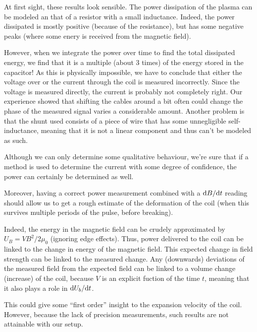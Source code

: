 At first sight, these results look sensible. The power dissipation of the 
plasma can be modeled an that of a resistor with a small inductance.  
Indeed, the power dissipated is mostly positive (because of the 
resistance), but has some negative peaks (where some enery is received from 
the magnetic field).

However, when we integrate the power over time to find the total dissipated 
energy, we find that it is a multiple (about 3 times) of the energy stored 
in the capacitor! As this is physically impossible, we have to conclude 
that either the voltage over or the current through the coil is measured 
incorrectly. Since the voltage is measured directly, the current is 
probably not completely right.  Our experience showed that shifting the 
cables around a bit often could change the phase of the measured signal 
varies a considerable amount.  Another problem is that the shunt used 
consists of a piece of wire that has some unnegligible self-inductance, 
meaning that it is not a linear component and thus can't be modeled as 
such.


Although we can only determine some qualitative behaviour, we're sure that if a 
method is used to determine the current with some degree of confidence, the 
power can certainly be determined as well.

Moreover, having a correct power measurement combined with a 
$\mathrm d B / \mathrm d t$ reading should allow us to get a rough estimate of the 
deformation of the coil (when this survives multiple periods of the pulse, 
before breaking).

Indeed, the energy in the magnetic field can be crudely approximated by $U_B = 
V B^2/2\mu_0$ (ignoring edge effects).  Thus, power delivered to the coil can 
be linked to the change in energy of the magnetic field. This expected change 
in field strength can be linked to the measured change. Any (downwards) 
deviations of the measured field from the expected field can be linked to a 
volume change (increase) of the coil, because $V$ is an explicit fuction of 
the time $t$, meaning that it also plays a role in $\mathrm d U_b / \mathrm d t$.

This could give some ``first order'' insight to the expansion velocity of 
the coil.  However, because the lack of precision measurements, such 
results are not attainable with our setup.


